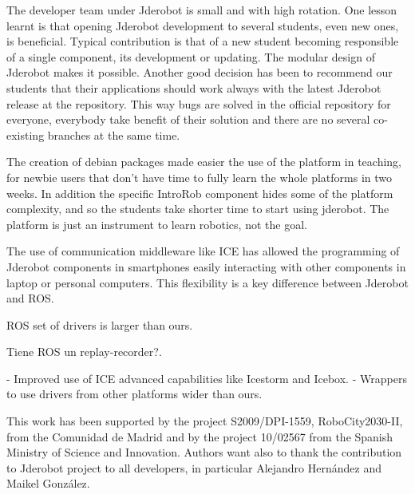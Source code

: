 \documentclass[twocolumn]{svjour3}          %
\begin{document}
The developer team under Jderobot is small and with high rotation. One lesson learnt is that opening Jderobot development to several students, even new ones, is beneficial. Typical contribution is that of a new student becoming responsible of a single component, its development or updating. The modular design of Jderobot makes it possible. Another good decision has been to recommend our students that their applications should work always with the latest Jderobot release at the repository. This way bugs are solved in the official repository for everyone, everybody take benefit of their solution and there are no several co-existing branches at the same time.

The creation of debian packages made easier the use of the platform in teaching, for newbie users that don't have time to fully learn the whole platforms in two weeks. In addition the specific IntroRob component hides some of the platform complexity, and so the students take shorter time to start using jderobot. The platform is just an instrument to learn robotics, not the goal.

The use of communication middleware like ICE has allowed the programming of Jderobot components in smartphones easily interacting with other components in laptop or personal computers. This flexibility is a key difference between Jderobot and ROS. 

ROS set of drivers is larger than ours.

Tiene ROS un replay-recorder?.

- Improved use of ICE advanced capabilities like Icestorm and Icebox.
- Wrappers to use drivers from other platforms wider than ours.

\begin{acknowledgements}
This work has been supported by the project S2009/DPI-1559, RoboCity2030-II, from the Comunidad de Madrid and by the project 10/02567 from the Spanish Ministry of Science and Innovation. Authors want also to thank the contribution to Jderobot project to all developers, in particular Alejandro Hernández and Maikel González.
\end{acknowledgements}

\end{document}
